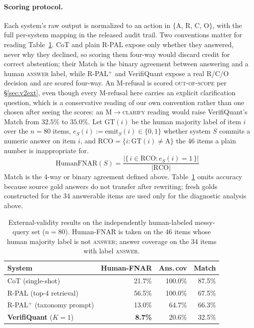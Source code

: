 \documentclass[sigconf,anonymous]{acmart}
\begin{document}
\paragraph{Scoring protocol.}
Each system's raw output is normalized to an action in $\{$A, R, C, O$\}$, with the full per-system mapping in the released audit trail. Two conventions matter for reading Table~\ref{tab:v2ext}. CoT and plain R-PAL expose only whether they answered, never why they declined, so scoring them four-way would discard credit for correct abstention; their Match is the binary agreement between answering and a human \textsc{answer} label, while R-PAL$^{+}$ and VerifiQuant expose a real R/C/O decision and are scored four-way. An M-refusal is scored \textsc{out-of-scope} per \S\ref{sec:v2ext}, even though every M-refusal here carries an explicit clarification question, which is a conservative reading of our own convention rather than one chosen after seeing the scores: an \textsc{M}$\to$\textsc{clarify} reading would raise VerifiQuant's Match from $32.5\%$ to $35.0\%$. Let $\mathrm{GT}(i)$ be the human majority label of item $i$ over the $n{=}80$ items, $e_S(i){:=}\mathrm{emit}_S(i){\in}\{0,1\}$ whether system $S$ commits a numeric answer on item $i$, and $\mathrm{RCO}=\{i : \mathrm{GT}(i)\neq\text{A}\}$ the $46$ items a plain number is inappropriate for.
\[
\mathrm{HumanFNAR}(S) = \frac{|\{\, i \in \mathrm{RCO} : e_S(i){=}1 \,\}|}{|\mathrm{RCO}|}
\]
Match is the 4-way or binary agreement defined above. Table~\ref{tab:v2ext} omits accuracy because source gold answers do not transfer after rewriting; fresh golds constructed for the 34 answerable items are used only for the diagnostic analysis above.

\begin{table}[t]
\caption{External-validity results on the independently human-labeled messy-query set ($n{=}80$). Human-FNAR is taken on the 46 items whose human majority label is not \textsc{answer}; answer coverage on the 34 items with label \textsc{answer}.}
\label{tab:v2ext}
\small
\begin{tabular}{@{}lrrr@{}}
\toprule
System & Human-FNAR & Ans.\,cov & Match \\
\midrule
CoT (single-shot) & 21.7\% & 100.0\% & 87.5\% \\
R-PAL (top-4 retrieval) & 56.5\% & 100.0\% & 67.5\% \\
R-PAL$^{+}$ (taxonomy prompt) & 13.0\% & 64.7\% & 66.3\% \\
\textbf{VerifiQuant} ($K{=}1$) & \textbf{8.7\%} & 20.6\% & 32.5\% \\
\bottomrule
\end{tabular}
\end{table}
\end{document}
